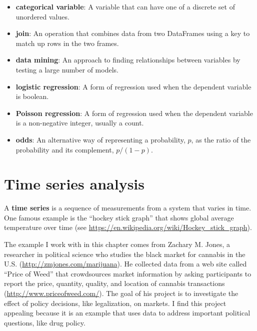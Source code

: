 \documentclass[12pt]{book}
\begin{document}
\begin{itemize}
\item {\bf categorical variable}: A variable that can have one of a
discrete set of unordered values.

\item {\bf join}: An operation that combines data from two DataFrames
using a key to match up rows in the two frames.

\item {\bf data mining}: An approach to finding relationships between
variables by testing a large number of models.

\item {\bf logistic regression}: A form of regression used when the
dependent variable is boolean.

\item {\bf Poisson regression}: A form of regression used when the
dependent variable is a non-negative integer, usually a count.

\item {\bf odds}: An alternative way of representing a probability, $p$, as
  the ratio of the probability and its complement, $p / (1-p)$.

\end{itemize}



\chapter{Time series analysis}

A {\bf time series} is a sequence of measurements from a system that
varies in time.  One famous example is the ``hockey stick graph'' that
shows global average temperature over time (see
\url{https://en.wikipedia.org/wiki/Hockey_stick_graph}).

The example I work with in this chapter comes from Zachary M. Jones, a
researcher in political science who studies the black market for
cannabis in the U.S.  (\url{http://zmjones.com/marijuana}).  He
collected data from a web site called ``Price of Weed'' that
crowdsources market information by asking participants to report the
price, quantity, quality, and location of cannabis transactions
(\url{http://www.priceofweed.com/}).  The goal of his project is to
investigate the effect of policy decisions, like legalization, on
markets.  I find this project appealing because it is an example that
uses data to address important political questions, like drug policy.
\end{document}
